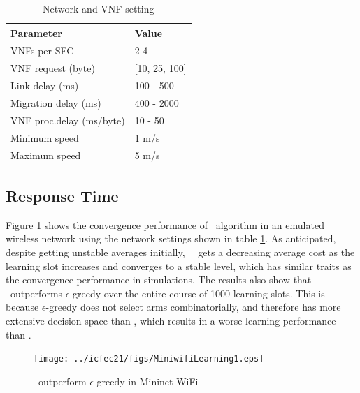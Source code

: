 \begin{table}
	\centering
	\setcellgapes{5pt}
	\caption{Network and VNF setting}
	\label{tab:network settings}
	\begin{tabular}{ll}
		
		\toprule
		Parameter & Value \\ [5pt]
		\midrule
		VNFs per SFC  &  2-4\\[5pt]
		VNF request (byte) & [10, 25, 100]\\[5pt]
		Link delay (ms)  & 100 - 500 \\[5pt]
		Migration delay (ms) & 400 - 2000 \\[5pt]
		VNF proc.delay (ms/byte) & 10 - 50 \\[5pt]
		Minimum speed & 1 m/s \\[5pt]
		Maximum speed & 5 m/s \\ [5pt]
		\bottomrule
	\end{tabular}
\end{table}

\subsection{Response Time}
Figure \ref{fig:myalgorithm performance} shows the convergence performance of \myalgorithm\ algorithm in an emulated wireless network using the network settings shown in table \ref{tab:network settings}. As anticipated, despite getting unstable averages initially, \myalgorithm\ \ gets a decreasing average cost as the learning slot increases and converges to a stable level, which has similar traits as the convergence performance in simulations. The results also show that \myalgorithm\ outperforms $\epsilon$-greedy over the entire course of 1000 learning slots. This is because $\epsilon$-greedy does not select arms combinatorially, and therefore has more extensive decision space than \myalgorithm, which results in a worse learning performance than \myalgorithm.
\begin{figure}
	\centering
	\texttt{[image: ../icfec21/figs/MiniwifiLearning1.eps]}
	\vspace{\baselineskip}
	\caption{\myalgorithm\ outperform $\epsilon$-greedy in Mininet-WiFi}
	\label{fig:myalgorithm performance}
\end{figure}


